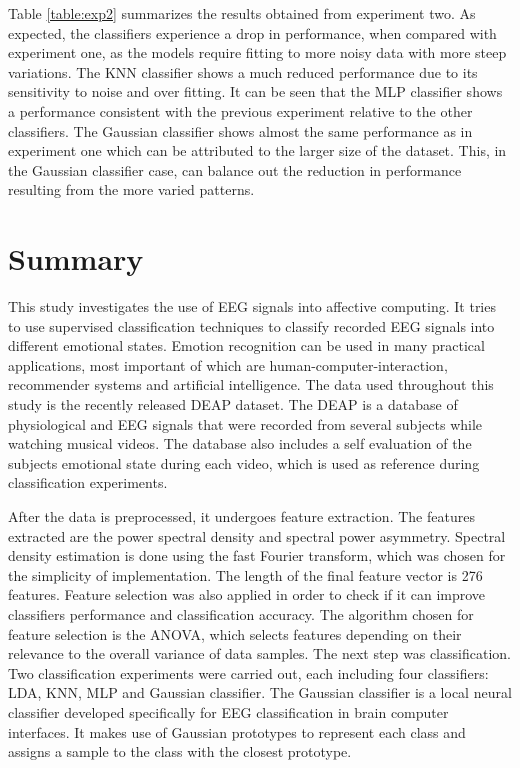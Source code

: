 \documentclass[12pt, a4paper, fleqn]{memoir}%
\begin{document}
Table \ref{table:exp2} summarizes the results obtained from experiment two. As expected, the classifiers experience a drop in performance, when compared with experiment one, as the models require fitting to more noisy data with more steep variations. The KNN classifier shows a much reduced performance due to its sensitivity to noise and over fitting. It can be seen that the MLP classifier shows a performance consistent with the previous experiment relative to the other classifiers. The Gaussian classifier shows almost the same performance as in experiment one which can be attributed to the larger size of the dataset. This, in the Gaussian classifier case, can balance out the reduction in performance resulting from the more varied patterns. 
\chapter{Summary}
This study investigates the use of EEG signals into affective computing. It tries to use supervised classification techniques to classify recorded EEG signals into different emotional states. Emotion recognition can be used in many practical applications, most important of which are human-computer-interaction, recommender systems and artificial intelligence. The data used throughout this study is the recently released DEAP dataset. The DEAP is a database of physiological and EEG signals that were recorded from several subjects while watching musical videos. The database also includes a self evaluation of the subjects emotional state during each video, which is used as reference during classification experiments.

After the data is preprocessed, it undergoes feature extraction. The features extracted are the power spectral density and spectral power asymmetry. Spectral density estimation is done using the fast Fourier transform, which was chosen for the simplicity of implementation. The length of the final feature vector is 276 features. Feature selection was also applied in order to check if it can improve classifiers performance and classification accuracy. The algorithm chosen for feature selection is the ANOVA, which selects features depending on their relevance to the overall variance of data samples. The next step was classification. Two classification experiments were carried out, each including four classifiers: LDA, KNN, MLP and Gaussian classifier. The Gaussian classifier is a local neural classifier developed specifically for EEG classification in brain computer interfaces. It makes use of Gaussian prototypes to represent each class and assigns a sample to the class with the closest prototype. 
\end{document}
